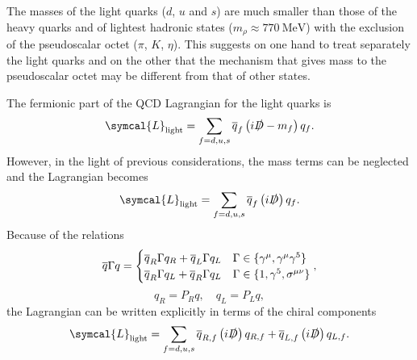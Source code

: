 The masses of the light quarks ($d$, $u$ and $s$) are much smaller than those of the heavy quarks and of lightest hadronic states ($m_\rho \approx 770 \ \text{MeV}$) with the exclusion of the pseudoscalar octet ($\pi$, $K$, $\eta$). This suggests on one hand to treat separately the light quarks and on the other that the mechanism that gives mass to the pseudoscalar octet may be different from that of other states.

The fermionic part of the QCD Lagrangian for the light quarks is
\begin{equation}
  \symcal{L}_\text{light} = \sum_{f = d, u, s} \adj{q}_f \left( i \slashed{D} - m_f \right) q_f .
\end{equation}
However, in the light of previous considerations, the mass terms can be neglected and the Lagrangian becomes
\begin{equation}
  \symcal{L}_\text{light} = \sum_{f = d, u, s} \adj{q}_f \left( i \slashed{D} \right) q_f .
  \label{eq:chiral_qcd_lagrangian}
\end{equation}
Because of the relations
\begin{equation}
  \overline{q} \Gamma q = 
  \begin{cases}
    \overline{q}_R \Gamma q_R + \overline{q}_L \Gamma q_L & \Gamma \in \{ \gamma^\mu , \gamma^\mu \gamma^5 \} \\
    \overline{q}_R \Gamma q_L + \overline{q}_R \Gamma q_L & \Gamma \in \{ 1 , \gamma^5 , \sigma^{\mu \nu} \} 
  \end{cases} ,
\end{equation}
\begin{equation}
  q_R = P_R q , \quad q_L = P_L q ,
\end{equation}
the Lagrangian can be written explicitly in terms of the chiral components
\begin{equation}
  \symcal{L}_\text{light} = \sum_{f = d, u, s} \adj{q}_{R, f} \left( i \slashed{D} \right) q_{R, f} + \adj{q}_{L, f} \left( i \slashed{D} \right) q_{L, f} .
\end{equation}

